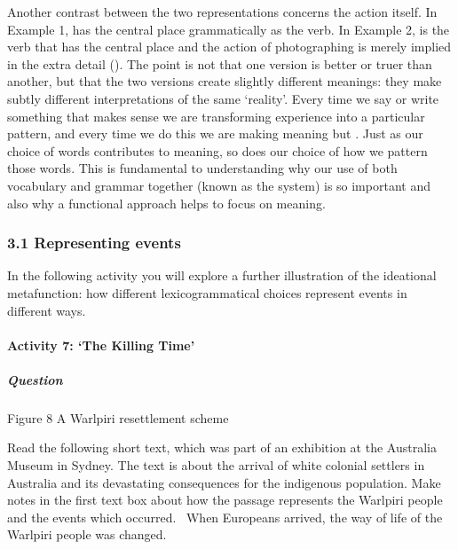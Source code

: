 \documentclass[letterpaper,10pt,english]{sphinxmanual}
\let\sphinxpxdimen\pdfpxdimen\else\newdimen\sphinxpxdimen
\begin{document}
Another contrast between the two representations concerns the action itself. In Example 1,  has the central place grammatically as the verb. In Example 2,  is the verb that has the central place and the action of photographing is merely implied in the extra detail (). The point is not that one version is better or truer than another, but that the two versions create slightly different meanings: they make subtly different interpretations of the same
‘reality’. Every time we say or write something that makes sense we are transforming experience into a particular pattern, and every time we do this we are making meaning \textendash{} but . Just as our choice of words contributes to meaning, so does our choice of how we pattern those words. This is fundamental to understanding why our use of both vocabulary and grammar together (known as the  system) is so important and also why a functional approach
helps to focus on meaning.


\subsubsection{3.1 Representing events}
\label{\detokenize{content/session_00/Part_00_03:3.1-Representing-events}}
In the following activity you will explore a further illustration of the ideational metafunction: how different lexicogrammatical choices represent events in different ways.


\paragraph{Activity 7: ‘The Killing Time’}
\label{\detokenize{content/session_00/Part_00_03:Activity-7:-_u2018The-Killing-Time_u2019}}


\subparagraph{Question}
\label{\detokenize{content/session_00/Part_00_03:Question}}
\sphinxincludegraphics[width=342\sphinxpxdimen,height=349\sphinxpxdimen]{{e304_ol_fig01}.jpg}

Figure 8 A Warlpiri resettlement scheme

Read the following short text, which was part of an exhibition at the Australia Museum in Sydney. The text is about the arrival of white colonial settlers in Australia and its devastating consequences for the indigenous population. Make notes in the first text box about how the passage represents the Warlpiri people and the events which occurred.  When Europeans arrived, the way of life of the Warlpiri people was changed.
\end{document}
